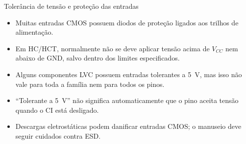 \begin{frame}{Tolerância de tensão e proteção das entradas}
    \begin{itemize}
        \item Muitas entradas CMOS possuem diodos de proteção ligados aos
              trilhos de alimentação.
        \item Em HC/HCT, normalmente não se deve aplicar tensão acima de
              $V_{CC}$ nem abaixo de GND, salvo dentro dos limites especificados.
        \item Alguns componentes LVC possuem entradas tolerantes a 5~V,
              mas isso não vale para toda a família nem para todos os pinos.
        \item ``Tolerante a 5~V'' não significa automaticamente que o
              pino aceita tensão quando o CI está desligado.
        \item Descargas eletrostáticas podem danificar entradas CMOS; o
              manuseio deve seguir cuidados contra ESD.
    \end{itemize}
\end{frame}
